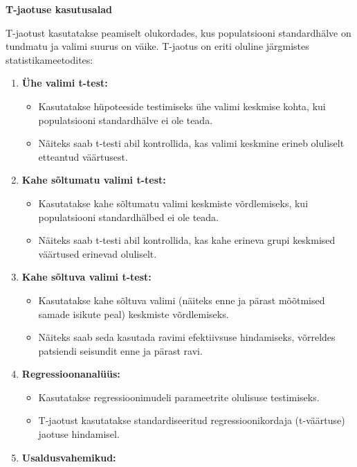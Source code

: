 \documentclass[
]{book}
\providecommand{\tightlist}{%
  \setlength{\itemsep}{0pt}\setlength{\parskip}{0pt}}
\begin{document}
\textbf{T-jaotuse kasutusalad}

T-jaotust kasutatakse peamiselt olukordades, kus populatsiooni standardhälve on tundmatu ja valimi suurus on väike. T-jaotus on eriti oluline järgmistes statistikameetodites:

\begin{enumerate}
\def\labelenumi{\arabic{enumi}.}
\tightlist
\item
  \textbf{Ühe valimi t-test:}

  \begin{itemize}
  \tightlist
  \item
    Kasutatakse hüpoteeside testimiseks ühe valimi keskmise kohta, kui populatsiooni standardhälve ei ole teada.
  \item
    Näiteks saab t-testi abil kontrollida, kas valimi keskmine erineb oluliselt etteantud väärtusest.
  \end{itemize}
\item
  \textbf{Kahe sõltumatu valimi t-test:}

  \begin{itemize}
  \tightlist
  \item
    Kasutatakse kahe sõltumatu valimi keskmiste võrdlemiseks, kui populatsiooni standardhälbed ei ole teada.
  \item
    Näiteks saab t-testi abil kontrollida, kas kahe erineva grupi keskmised väärtused erinevad oluliselt.
  \end{itemize}
\item
  \textbf{Kahe sõltuva valimi t-test:}

  \begin{itemize}
  \tightlist
  \item
    Kasutatakse kahe sõltuva valimi (näiteks enne ja pärast mõõtmised samade isikute peal) keskmiste võrdlemiseks.
  \item
    Näiteks saab seda kasutada ravimi efektiivsuse hindamiseks, võrreldes patsiendi seisundit enne ja pärast ravi.
  \end{itemize}
\item
  \textbf{Regressioonanalüüs:}

  \begin{itemize}
  \tightlist
  \item
    Kasutatakse regressioonimudeli parameetrite olulisuse testimiseks.
  \item
    T-jaotust kasutatakse standardiseeritud regressioonikordaja (t-väärtuse) jaotuse hindamisel.
  \end{itemize}
\item
  \textbf{Usaldusvahemikud:}


\end{enumerate}
\end{document}
